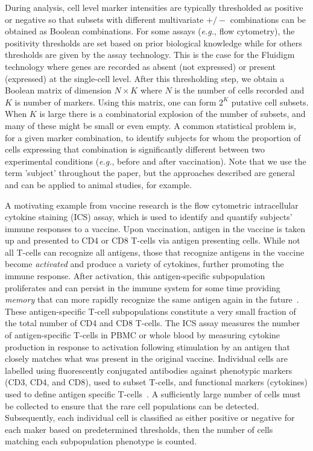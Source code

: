 \documentclass[useAMS,referee,usenatbib]{biom}
\begin{document}
During analysis, cell level marker intensities are typically thresholded as positive or negative so that subsets with different multivariate $+/-$ combinations can be obtained as Boolean combinations. 
For some assays (\textit{e.g.}, flow cytometry), the positivity thresholds are set based on prior biological knowledge while for others thresholds are given by the assay technology. 
This is the case for the Fluidigm technology where genes are recorded as absent (not expressed) or present (expressed) at the single-cell level.
 After this thresholding step, we obtain a Boolean matrix of dimension $N\times K$ where $N$ is the number of cells recorded and $K$ is number of markers. 
Using this matrix, one can form $2^K$ putative cell subsets. 
When $K$ is large there is a combinatorial explosion of the number of subsets, and many of these might be small or even empty. 
A common statistical problem is, for a given marker combination, to identify subjects for whom the proportion of cells expressing that combination is significantly different between two experimental conditions (\textit{e.g.}, before and after vaccination). Note that we use the term 'subject' throughout the paper, but the approaches described are general and can be applied to animal studies, for example.

A motivating example from vaccine research is the flow cytometric intracellular cytokine staining (ICS) assay, which is used to identify and quantify subjects' immune responses to a vaccine. Upon vaccination, antigen in the vaccine is taken up and presented to CD4 or CD8 T-cells via antigen presenting cells.
 While not all T-cells can recognize all antigens, those that recognize antigens in the vaccine become \emph{activated} and produce a variety of cytokines, further promoting the immune response. 
 After activation, this antigen-specific subpopulation proliferates and can persist in the immune system for some time providing \emph{memory} that can more rapidly recognize the same antigen again in the future~\citep{McKinstry:2010ei}. These antigen-specific T-cell subpopulations constitute a very small fraction of the total number of CD4 and CD8 T-cells. The ICS assay measures the number of antigen-specific T-cells in PBMC or whole blood by measuring cytokine production in response to activation following stimulation by an antigen that closely matches what was present in the original vaccine. 
Individual cells are labelled using fluorescently conjugated antibodies against phenotypic markers (CD3, CD4, and CD8), used to subset T-cells, and functional markers (cytokines) used to define antigen specific T-cells~\citep{Horton:2007tsa,DeRosa:2004wp,Betts:2006dw}.
A sufficiently large number of cells must be collected to ensure that the rare cell populations can be detected. 
Subsequently, each individual cell is classified as either positive or negative for each maker based on predetermined thresholds, then the number of cells matching each subpopulation phenotype is counted. 
\end{document}
